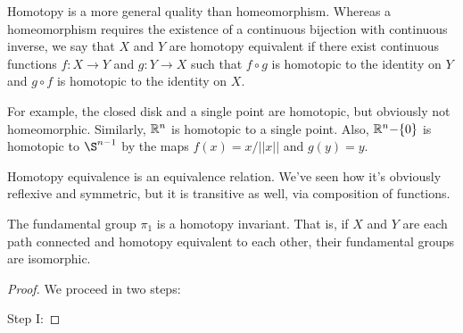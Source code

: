 
Homotopy is a more general quality than homeomorphism.  Whereas a homeomorphism requires the existence of a continuous bijection with continuous inverse, we say that $X$ and $Y$ are homotopy equivalent if there exist continuous functions $f:X\rightarrow Y$ and $g:Y\rightarrow X$ such that $f\circ g$ is homotopic to the identity on $Y$ and $g\circ f$ is homotopic to the identity on $X$.

For example, the closed disk and a single point are homotopic, but obviously not homeomorphic.  Similarly, $\mathbb{R}^n$ is homotopic to a single point.  Also, $\mathbb{R}^n{-}\{0\}$ is homotopic to $\S^{n-1}$ by the maps $f(x)=x/||x||$ and $g(y)=y$.

Homotopy equivalence is an equivalence relation.  We've seen how it's obviously reflexive and symmetric, but it is transitive as well, via composition of functions.

\begin{theorem}
	The fundamental group $\pi_1$ is a homotopy invariant.  That is, if $X$ and $Y$ are each path connected and homotopy equivalent to each other, their fundamental groups are isomorphic.
\end{theorem}
\begin{proof}
	We proceed in two steps:
	
	Step I:
	
\end{proof}
